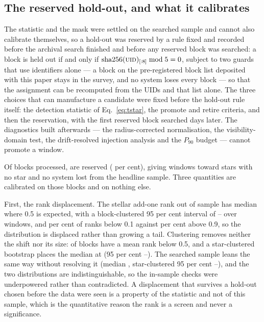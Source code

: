 \subsection{The reserved hold-out, and what it calibrates}
\label{sec:heldout}

The statistic and the mask were settled on the searched sample and cannot
also calibrate themselves, so a hold-out was reserved by a rule fixed and
recorded before the archival search finished and before any reserved block
was searched: a block is held out if and only if
$\mathrm{sha256}(\textsc{uid})_{[:8]} \bmod 5 = 0$, subject to two guards
that use identifiers alone --- a block on the pre-registered block list
deposited with this paper stays in the survey, and no system loses every
block --- so that the assignment can be recomputed from the UIDs and that
list alone. The three choices that can manufacture a
candidate were fixed before the hold-out rule itself: the detection statistic
of Eq.~\ref{eq:tstar}, the promote and retire criteria, and then the
reservation, with the first reserved block searched \HoLeadBlockDays{} days
later. The diagnostics built afterwards --- the radius-corrected
normalisation, the visibility-domain test, the drift-resolved injection
analysis and the $P_{90}$ budget --- cannot promote a window.

Of \NEbProcessedAll{} blocks processed, \NEbHeldOut{} are reserved
(\HoPctHeld{} per cent), giving \HoWin{} windows toward \HoStars{} stars with
no star and no system lost from the headline sample. Three quantities are
calibrated on those blocks and on nothing else.

First, the rank displacement. The stellar add-one rank out of sample has
median \HoRankMed{} where 0.5 is expected, with a block-clustered 95 per cent
interval of \HoRankMedLo--\HoRankMedHi{} over \HoWin{} windows, and
\HOFracLoPct{} per cent of ranks below 0.1 against \HOFracHiPct{} per cent
above 0.9, so the distribution is displaced rather than growing a tail.
Clustering removes neither the shift nor its size: \HOBlockBelow{} of
\HOBlockN{} blocks have a mean rank below 0.5, and a star-clustered bootstrap
places the median at \HOBootMed{} (95 per cent \HOBootLo--\HOBootHi). The
searched sample leans the same way without resolving it (median \SurvMedP,
star-clustered 95 per cent \SurvBootLo--\SurvBootHi), and the two
distributions are indistinguishable, so the in-sample checks were
underpowered rather than contradicted. A displacement that survives a
hold-out chosen before the data were seen is a property of the statistic and
not of this sample, which is the quantitative reason the rank is a screen and
never a significance.


